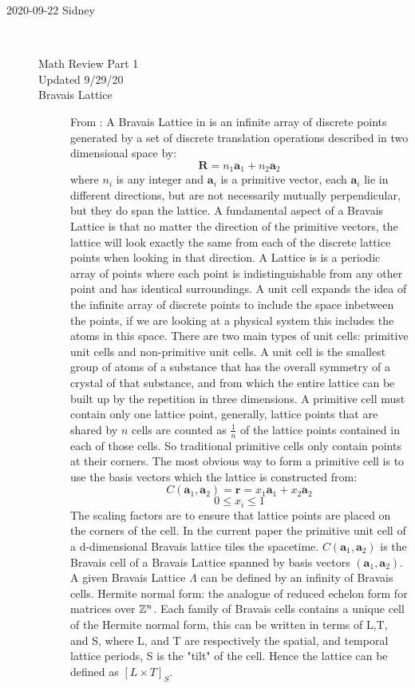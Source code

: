 \begin{description}
\item[2020-09-22 Sidney]~~
\begin{description}
\item[Math Review Part 1]
\item[Updated 9/29/20]
\item[Bravais Lattice]

From : A Bravais Lattice in is an infinite array of discrete points generated by a set of discrete translation operations described in two dimensional space by:
$$\mathbf{R}=n_1\mathbf{a}_1+n_2\mathbf{a}_2$$
where $n_i$ is any integer and $\mathbf{a}_i$ is a primitive vector, each $\mathbf{a}_i$ lie in different directions, but are not necessarily mutually perpendicular, but they do span the lattice. A fundamental aspect of a Bravais Lattice is that no matter the direction of the primitive vectors, the lattice will look exactly the same from each of the discrete lattice points when looking in that direction. A Lattice is is a periodic array of points where each point is indistinguishable from any other point and has identical surroundings. A unit cell expands the idea of the infinite array of discrete points to include the space inbetween the points, if we are looking at a physical system this includes the atoms in this space. There are two main types of unit cells: primitive unit cells and non-primitive unit cells. A unit cell is the smallest group of atoms of a substance that has the overall symmetry of a crystal of that substance, and from which the entire lattice can be built up by the repetition in three dimensions. A primitive cell must contain only one lattice point, generally, lattice points that are shared by $n$ cells are counted as $\frac{1}{n}$ of the lattice points contained in each of those cells. So traditional primitive cells only contain points at their corners. The most obvious way to form a primitive cell is to use the basis vectors which the lattice is constructed from:
$$C(\mathbf{a}_1,\mathbf{a}_2)=\mathbf{r}=x_1\mathbf{a}_1+x_2\mathbf{a}_2$$
$$0\leq x_i\leq 1$$
The scaling factors are to ensure that lattice points are placed on the corners of the cell. In the current paper the primitive unit cell of a d-dimensional Bravais lattice tiles the spacetime. $C(\mathbf{a}_1,\mathbf{a}_2)$ is the Bravais cell of a Bravais Lattice spanned by basis vectors $(\mathbf{a}_1,\mathbf{a}_2)$. A given Bravais Lattice $\Lambda$ can be defined by an infinity of Bravais cells. Hermite normal form: the analogue of reduced echelon form for matrices over $\mathbb{Z}^n$. Each family of Bravais cells contains a unique cell of the Hermite normal form, this can be written in terms of L,T, and S, where L, and T are respectively the spatial, and temporal lattice periods, S is the "tilt" of the cell. Hence the lattice can be defined as $[L\times T]_S$.


\end{description}
\end{description}
